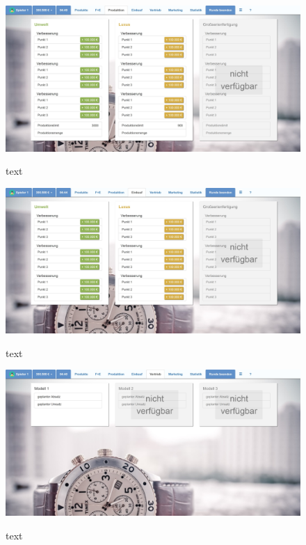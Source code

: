 \begin{figure} 
	\centering
	\includegraphics[scale=0.1]{img/bilder_layout/MockUp4.jpg}
	\label{key}
	\caption{text} 
\end{figure}
\begin{figure} 
	\centering
	\includegraphics[scale=0.1]{img/bilder_layout/MockUp6.jpg}
	\label{key}
	\caption{text} 
\end{figure}
\begin{figure} 
	\centering
	\includegraphics[scale=0.1]{img/bilder_layout/MockUp7.jpg}
	\label{key}
	\caption{text} 
\end{figure}
